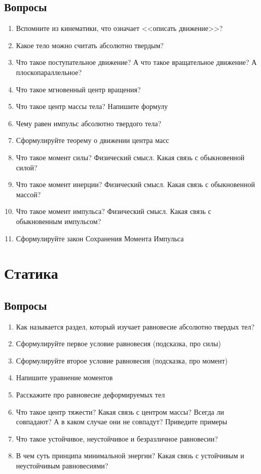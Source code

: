 \documentclass[12pt,a4paper]{report}
\begin{document}
\section{Вопросы}
\begin{enumerate}
\item Вспомните из кинематики, что означает <<описать движение>>?
\item Какое тело можно считать абсолютно твердым?
\item Что такое поступательное движение? А что такое вращательное движение? А плоскопараллельное?
\item Что такое мгновенный центр вращения?
\item Что такое центр массы тела? Напишите формулу
\item Чему равен импульс абсолютно твердого тела?
\item Сформулируйте теорему о движении центра масс
\item Что такое момент силы? Физический смысл. Какая связь с обыкновенной силой?
\item Что такое момент инерции? Физический смысл. Какая связь с обыкновенной массой?
\item Что такое момент импульса? Физический смысл. Какая связь с обыкновенным импульсом?
\item Сформулируйте закон Сохранения Момента Импульса
\end{enumerate}

\chapter{Статика}
\section{Вопросы}
\begin{enumerate}
\item Как называется раздел, который изучает равновесие абсолютно твердых тел?
\item Сформулируйте первое условие равновесия (подсказка, про силы)
\item Сформулируйте второе условие равновесия (подсказка, про момент)
\item Напишите уравнение моментов
\item Расскажите про равновесие деформируемых тел
\item Что такое центр тяжести? Какая связь с центром массы? Всегда ли совпадают? А в каком случае они не совпадут? Приведите примеры
\item Что такое устойчивое, неустойчивое и безразличное равновесии?
\item В чем суть принципа минимальной энергии? Какая связь с устойчивым и неустойчивым равновесиями?

\end{enumerate}
\end{document}
